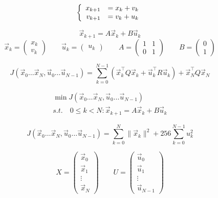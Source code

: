 \documentclass{article}
\begin{document}
\thispagestyle{empty}


\iffalse
$$
\left \{ \begin{array}{r l}
x_{k+1} & = x_k + v_k\\
v_{k+1} & = v_k + u_k
\end{array} \right.
$$


$$
\vec{x}_{k+1} = A \vec{x}_k + B \vec{u}_k
$$
$$
\vec{x}_k=\begin{pmatrix}x_k\\v_k\end{pmatrix}\qquad \vec{u}_k=\begin{pmatrix}u_k\end{pmatrix}\qquad A=\begin{pmatrix} 1 & 1 \\ 0 & 1\end{pmatrix} \qquad B=\begin{pmatrix}0\\1\end{pmatrix}
$$

$$
J(\vec{x}_0\dots\vec{x}_N,\vec{u}_0\dots\vec{u}_{N-1}) = \sum\limits_{k=0}^{N-1}\left( \vec{x}_k^\top Q\vec{x}_k + \vec{u}_k^\top R\vec{u}_k\right) + \vec{x}_N^\top Q \vec{x}_N
$$

$$
\begin{array}{l}
\min J(\vec{x}_0\dots\vec{x}_N,\vec{u}_0\dots\vec{u}_{N-1})\\
s.t.\quad 0\leq k < N : \vec{x}_{k+1} = A \vec{x}_k + B \vec{u}_k
\end{array}
$$

$$
J(\vec{x}_0\dots\vec{x}_N,\vec{u}_0\dots\vec{u}_{N-1}) = \sum\limits_{k=0}^{N} \|\vec{x}_k\|^2 + 256 \sum\limits_{k=0}^{N-1} u_k^2
$$


$$
X=\begin{pmatrix}\vec{x}_0\\ \vec{x}_1 \\ \vdots \\ \vec{x}_N\end{pmatrix} 
\qquad
U=\begin{pmatrix}\vec{u}_0\\ \vec{u}_1 \\ \vdots \\ \vec{u}_{N-1}\end{pmatrix} 
$$
\end{document}
